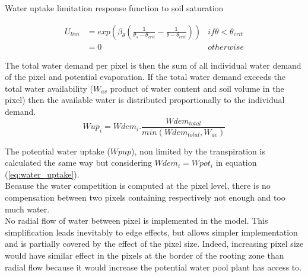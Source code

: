 \documentclass[a4paper,twoside, justified,marginals=raggedright, nobib]{tufte-handout}
\begin{document}
\begin{marginfigure}[-40pt]
\label{fig:derivaives}
\caption{Water uptake limitation response function to soil saturation}
\end{marginfigure}

\begin{align}
U_{lim} &= exp\left(\beta_{\theta} \left( \frac{1}{\theta_{s} - \theta_{crit}} - \frac{1}{\theta - \theta_{crit}}\right)\right) & if \theta < \theta_{crit}\\
 &= 0 & otherwise
\end{align}

The total water demand per pixel is then the sum of all individual water demand of the pixel and potential evaporation. If the total water demand exceeds the total water availability ($W_{av}$ product of water content and soil volume in the pixel) then the available water is distributed proportionally to the individual demand.\\
\begin{equation}\label{eq:water_uptake}
Wup_{i} = Wdem_{i} . \frac{Wdem_{total}}{min(Wdem_{total}, W_{av})}
\end{equation}


\indent The potential water uptake ($Wpup$), non limited by the transpiration is calculated the same way but considering $Wdem_{i} = Wpot_{i}$ in equation (\ref{eq:water_uptake}).\\
\indent Because the water competition is computed at the pixel level, there is no compensation between two pixels containing respectively not enough and too much water.\\
\indent No radial flow of water between pixel is implemented in the model. This simplification leads inevitably to edge effects, but allows simpler implementation and is partially covered by the effect of the pixel size. Indeed, increasing pixel size would have similar effect in the pixels at the border of the rooting zone than radial flow because it would increase the potential water pool plant has access to.\\
\end{document}
